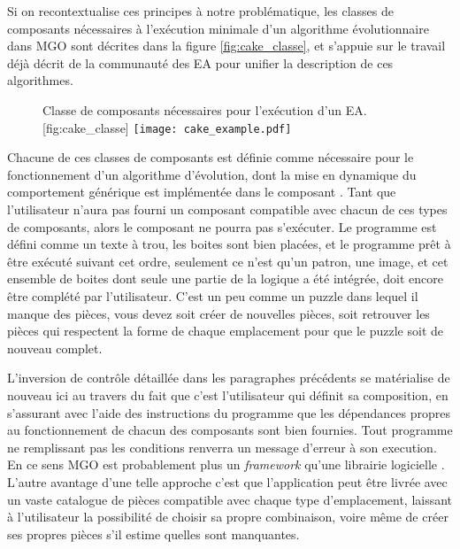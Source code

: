 Si on recontextualise ces principes à notre problématique, les classes de composants nécessaires à l'exécution minimale d'un algorithme évolutionnaire dans MGO sont décrites dans la figure \ref{fig:cake_classe}, et s'appuie sur le travail déjà décrit de la communauté des EA pour unifier la description de ces algorithmes.

\begin{figure}[!htbp]
	\begin{sidecaption}[fortoc]{Classe de composants nécessaires pour l'exécution d'un EA.}[fig:cake_classe]
		\centering
		\texttt{[image: cake\_example.pdf]}{
		}
  \end{sidecaption}
\end{figure}

Chacune de ces classes de composants est définie comme nécessaire pour le fonctionnement d'un algorithme d'évolution, dont la mise en dynamique du comportement générique est implémentée dans le composant . Tant que l'utilisateur n'aura pas fourni un composant compatible avec chacun de ces types de composants, alors le composant  ne pourra pas s'exécuter. Le programme est défini comme un texte à trou, les boites sont bien placées, et le programme prêt à être exécuté suivant cet ordre, seulement ce n'est qu'un patron, une image, et cet ensemble de boites dont seule une partie de la logique a été intégrée, doit encore être complété par l'utilisateur. C'est un peu comme un puzzle dans lequel il manque des pièces, vous devez soit créer de nouvelles pièces, soit retrouver les pièces qui respectent la forme de chaque emplacement pour que le puzzle soit de nouveau complet. 

L'inversion de contrôle détaillée dans les paragraphes précédents se matérialise de nouveau ici au travers du fait que c'est l'utilisateur qui définit sa composition, en s'assurant avec l'aide des instructions du programme que les dépendances propres au fonctionnement de chacun des composants sont bien fournies. Tout programme ne remplissant pas les conditions renverra un message d'erreur à son execution. En ce sens MGO est probablement plus un \textit{framework} qu'une librairie logicielle . L'autre avantage d'une telle approche c'est que l'application peut être livrée avec un vaste catalogue de pièces compatible avec chaque type d'emplacement, laissant à l'utilisateur la possibilité de choisir sa propre combinaison, voire même de créer ses propres pièces s'il estime quelles sont manquantes. 

